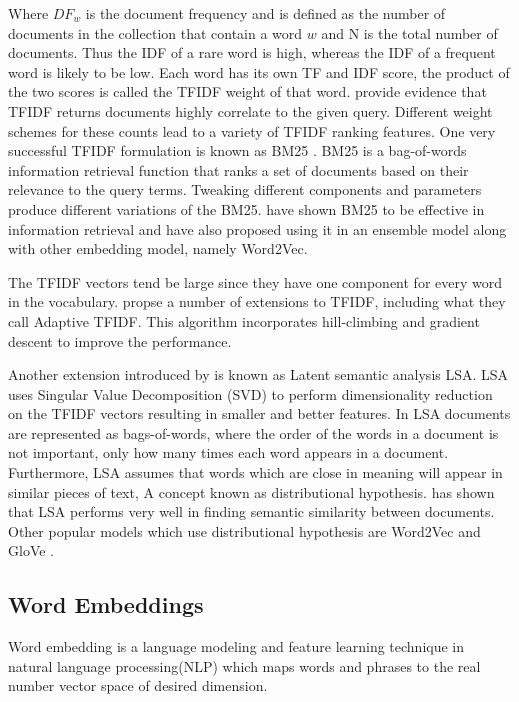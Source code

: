 Where $DF_{w}$ is the document frequency and is defined as the number of documents in the collection that contain a word $w$ and N is the total number of documents. Thus the IDF of a rare word is high, whereas the IDF of a frequent word is likely to be low. Each word has its own TF and IDF score, the product of the two scores is called the TFIDF weight of that word. \cite{ramos2003using} provide evidence that TFIDF returns
documents highly correlate to the given query. Different weight schemes for these counts lead to a variety of TFIDF ranking features. One very successful TFIDF
formulation is known as BM25 \cite{robertson2009probabilistic}.
BM25  is a bag-of-words information retrieval function that ranks a set of documents based on their relevance to the query terms. Tweaking different components and parameters produce different variations of the BM25. \cite{mitra2016dual} have shown BM25 to be effective in information retrieval and have also proposed using it in an ensemble model along with other embedding model, namely Word2Vec. 

The TFIDF vectors tend be large since they have one component for every word in the vocabulary. \cite{berger2000bridging} propse a number of extensions to TFIDF, including what they call Adaptive TFIDF. This algorithm incorporates hill-climbing and gradient descent to improve the performance.

Another extension introduced by \cite{dumais2004latent} is known as Latent semantic analysis LSA.
LSA uses Singular Value Decomposition (SVD) to perform dimensionality reduction on the TFIDF vectors resulting in smaller and better features. In LSA documents are represented as bags-of-words, where the order of the words in a document is not important, only how many times each word appears in a document. Furthermore, LSA assumes that words which are close in meaning will appear in similar pieces of text, A concept known as  distributional hypothesis. \cite{boling2014semantic} has shown that LSA performs very well in finding semantic similarity between documents. Other popular models which use distributional hypothesis are Word2Vec \cite{mikolov2013efficient} and GloVe \cite{pennington2014glove}. 
\subsection{Word Embeddings} 
Word embedding is a language modeling and feature learning technique in natural language processing(NLP) which maps words and phrases to the real number vector space of desired dimension. 

